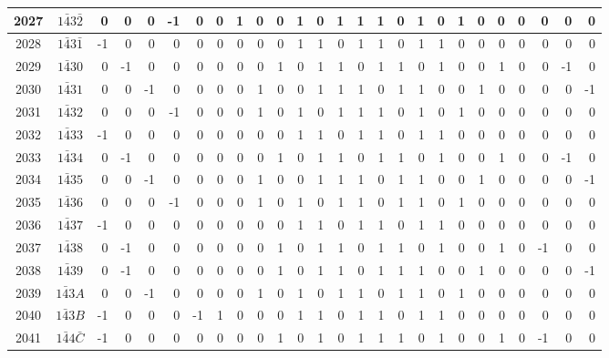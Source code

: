\documentclass[12 pt]{article}%
\begin{document}
\begin{tiny}
\begin{centering}
\begin{longtable}{|c|c||rrrrrrrrrrrrrrrrrrrrrrrr|}
      \hline
      2027 & $1\bar43\bar2$ & 0 & 0 & 0 & -1 & 0 & 0 & 1 & 0 & 0 & 1 & 0 & 1 & 1 & 1 & 0 & 1 & 0 & 1 & 0 & 0 & 0 & 0 & 0 & 0 \\
      \hline
      2028 & $1\bar43\bar1$ & -1 & 0 & 0 & 0 & 0 & 0 & 0 & 0 & 0 & 1 & 1 & 0 & 1 & 1 & 0 & 1 & 1 & 0 & 0 & 0 & 0 & 0 & 0 & 0 \\
      \hline
      2029 & $1\bar430$ & 0 & -1 & 0 & 0 & 0 & 0 & 0 & 0 & 1 & 0 & 1 & 1 & 0 & 1 & 1 & 0 & 1 & 0 & 0 & 1 & 0 & 0 & -1 & 0 \\
      \hline
      2030 & $1\bar431$ & 0 & 0 & -1 & 0 & 0 & 0 & 0 & 1 & 0 & 0 & 1 & 1 & 1 & 0 & 1 & 1 & 0 & 0 & 1 & 0 & 0 & 0 & 0 & -1 \\
      \hline
      2031 & $1\bar432$ & 0 & 0 & 0 & -1 & 0 & 0 & 0 & 1 & 0 & 1 & 0 & 1 & 1 & 1 & 0 & 1 & 0 & 1 & 0 & 0 & 0 & 0 & 0 & 0 \\
      \hline
      2032 & $1\bar433$ & -1 & 0 & 0 & 0 & 0 & 0 & 0 & 0 & 0 & 1 & 1 & 0 & 1 & 1 & 0 & 1 & 1 & 0 & 0 & 0 & 0 & 0 & 0 & 0 \\
      \hline
      2033 & $1\bar434$ & 0 & -1 & 0 & 0 & 0 & 0 & 0 & 0 & 1 & 0 & 1 & 1 & 0 & 1 & 1 & 0 & 1 & 0 & 0 & 1 & 0 & 0 & -1 & 0 \\
      \hline
      2034 & $1\bar435$ & 0 & 0 & -1 & 0 & 0 & 0 & 0 & 1 & 0 & 0 & 1 & 1 & 1 & 0 & 1 & 1 & 0 & 0 & 1 & 0 & 0 & 0 & 0 & -1 \\
      \hline
      2035 & $1\bar436$ & 0 & 0 & 0 & -1 & 0 & 0 & 0 & 1 & 0 & 1 & 0 & 1 & 1 & 0 & 1 & 1 & 0 & 1 & 0 & 0 & 0 & 0 & 0 & 0 \\
      \hline
      2036 & $1\bar437$ & -1 & 0 & 0 & 0 & 0 & 0 & 0 & 0 & 0 & 1 & 1 & 0 & 1 & 1 & 0 & 1 & 1 & 0 & 0 & 0 & 0 & 0 & 0 & 0 \\
      \hline
      2037 & $1\bar438$ & 0 & -1 & 0 & 0 & 0 & 0 & 0 & 0 & 1 & 0 & 1 & 1 & 0 & 1 & 1 & 0 & 1 & 0 & 0 & 1 & 0 & -1 & 0 & 0 \\
      \hline
      2038 & $1\bar439$ & 0 & -1 & 0 & 0 & 0 & 0 & 0 & 0 & 1 & 0 & 1 & 1 & 0 & 1 & 1 & 1 & 0 & 0 & 1 & 0 & 0 & 0 & 0 & -1 \\
      \hline
      2039 & $1\bar43A$ & 0 & 0 & -1 & 0 & 0 & 0 & 0 & 1 & 0 & 1 & 0 & 1 & 1 & 0 & 1 & 1 & 0 & 1 & 0 & 0 & 0 & 0 & 0 & 0 \\
      \hline
      2040 & $1\bar43B$ & -1 & 0 & 0 & 0 & -1 & 1 & 0 & 0 & 0 & 1 & 1 & 0 & 1 & 1 & 0 & 1 & 1 & 0 & 0 & 0 & 0 & 0 & 0 & 0 \\
      \hline
      2041 & $1\bar44\bar C$ & -1 & 0 & 0 & 0 & 0 & 0 & 0 & 0 & 1 & 0 & 1 & 0 & 1 & 1 & 1 & 0 & 1 & 0 & 0 & 1 & 0 & -1 & 0 & 0 \\

\end{longtable}
\end{centering}
\end{tiny}
\end{document}
